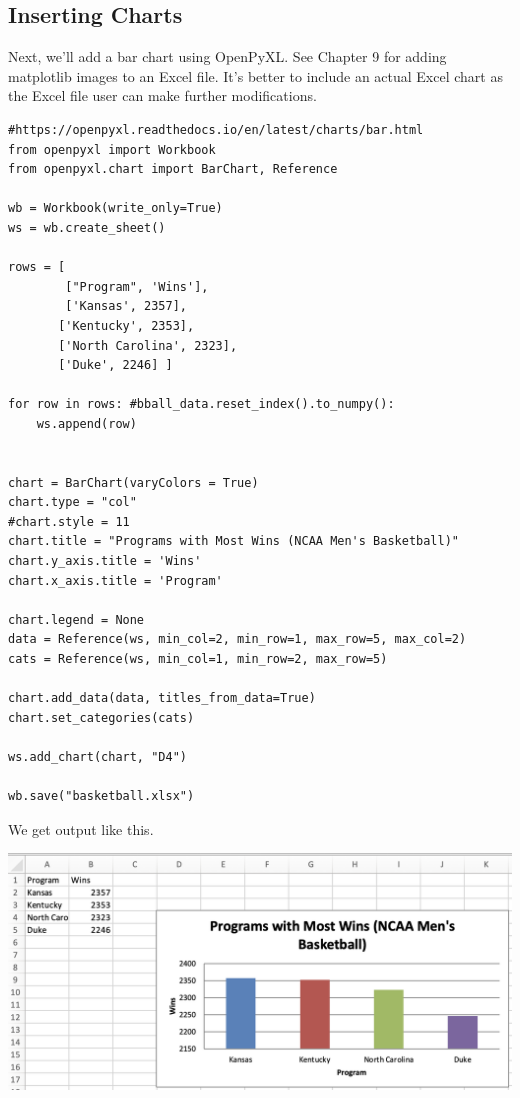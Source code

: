 \subsection{Inserting Charts}

Next, we'll add a bar chart using OpenPyXL. See \cite{zumstein2021} Chapter 9 for adding matplotlib images to an Excel file. It's better to include an actual Excel chart as the Excel file user can make further modifications. 



\begin{lstlisting}
#https://openpyxl.readthedocs.io/en/latest/charts/bar.html
from openpyxl import Workbook
from openpyxl.chart import BarChart, Reference

wb = Workbook(write_only=True)
ws = wb.create_sheet()

rows = [ 
        ["Program", 'Wins'],
        ['Kansas', 2357],
       ['Kentucky', 2353],
       ['North Carolina', 2323],
       ['Duke', 2246] ]

for row in rows: #bball_data.reset_index().to_numpy():
    ws.append(row)


chart = BarChart(varyColors = True)
chart.type = "col"
#chart.style = 11
chart.title = "Programs with Most Wins (NCAA Men's Basketball)"
chart.y_axis.title = 'Wins'
chart.x_axis.title = 'Program'

chart.legend = None
data = Reference(ws, min_col=2, min_row=1, max_row=5, max_col=2)
cats = Reference(ws, min_col=1, min_row=2, max_row=5)

chart.add_data(data, titles_from_data=True)
chart.set_categories(cats)

ws.add_chart(chart, "D4")

wb.save("basketball.xlsx")
\end{lstlisting}


We get output like this. 

\begin{center}
    \includegraphics[width = .8\textwidth]{images/basketball_excel.png}
\end{center}